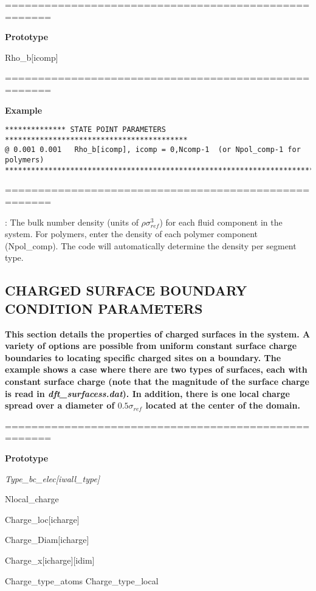 \documentclass[10pt,onecolumn]{article}
\begin{document}
\noindent=====================================================

{\bf Prototype}

{\it

Rho\_b[icomp]

}

\noindent=====================================================

{\bf Example}

\begin{verbatim}
************** STATE POINT PARAMETERS ******************************************
@ 0.001 0.001   Rho_b[icomp], icomp = 0,Ncomp-1  (or Npol_comp-1 for polymers)
***********************************************************************
\end{verbatim}

\noindent=====================================================
\vspace{0.1in}


\vspace{0.1in}
: The bulk number density (units of $\rho
\sigma_{ref}^3$) for each fluid component in the system.  For
polymers, enter the density of each polymer component
(Npol\_comp).  The code will automatically determine the density
per segment type.


\vfill
\break

\subsection{CHARGED SURFACE BOUNDARY CONDITION PARAMETERS}
{\bf  This
section details the properties of charged surfaces in the system.
A variety of options are possible from uniform constant surface
charge boundaries to locating specific charged sites on a
boundary.    The example shows a case where
there are two types of surfaces, each with constant surface
charge (note that the magnitude of the surface charge is read in {\it dft\_surfacess.dat}).  
In addition, there is one local charge spread over a
diameter of $0.5\sigma_{ref}$ located at the
center of the domain.}


\noindent=====================================================

{\bf Prototype}

{\it Type\_bc\_elec[iwall\_type]

Nlocal\_charge

Charge\_loc[icharge]

Charge\_Diam[icharge]

Charge\_x[icharge][idim]

Charge\_type\_atoms  Charge\_type\_local
}
\end{document}
